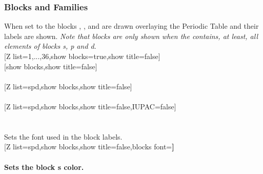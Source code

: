 \vfill%
\subsubsection{\texorpdfstring{ Blocks and Families}{Blocks and Families}}
\label{option_show blocks}%
%
{When set to  the blocks , ,  and  are drawn overlaying the Periodic Table and their labels are shown. \textit{Note that blocks are only shown when the  contains, at least, all elements of blocks s, p and d}.}%
\\ [5pt][Z list={1,...,36},show blocks=true,show title=false]%
\\ [10pt]\makebox[\linewidth][c]{\scalebox{.6}{\pgfPT[Z list={1,...,36},show blocks=true,show title=false]}}%
\newpage%
[show blocks,show title=false]%
\\ [5pt]\makebox[\linewidth][c]{\scalebox{.6}{\pgfPT[show blocks,show title=false]}}%
\\ [5pt][Z list=spd,show blocks,show title=false]%
\\ [5pt]\makebox[\linewidth][c]{\scalebox{.6}{\pgfPT[Z list=spd,show blocks,show title=false]}}%
\\ [5pt][Z list=spd,show blocks,show title=false,IUPAC=false]%
\\ [5pt]\makebox[\linewidth][c]{\scalebox{.6}{\pgfPT[Z list=spd,show blocks,show title=false,IUPAC=false]}}%
\\ [0pt]\pgfPTendoption%
\newpage\ \\ [-32pt]%
\label{option_blocks font}%
%
{Sets the font used in the block labels.}%
\\ [5pt][Z list=spd,show blocks,show title=false,blocks font=\string\small\string\bfseries\string{}\string\selectfont]%
\\ [10pt]\makebox[\linewidth][c]{\scalebox{.6}{\pgfPT[Z list=spd,show blocks,show title=false,blocks font=\small\bfseries\fontfamily{ptm}\selectfont]}}%
\\ [0pt]\pgfPTendoption%
\label{option_s block color}%
%
{Sets the block s color.}%
